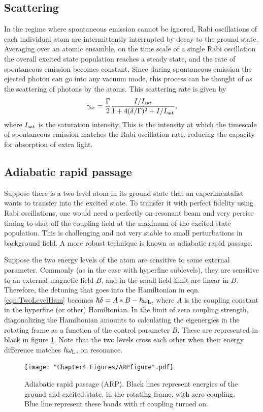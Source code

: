 \subsection{Scattering}
In the regime where spontaneous emission cannot be ignored, Rabi oscillations of each individual atom are intermittently interrupted by decay to the ground state. Averaging over an atomic ensamble, on the time scale of a single Rabi oscillation the overall excited state population reaches a steady state, and the rate of spontaneous emission becomes constant. Since during spontaneous emission the ejected photon can go into any vacuum mode, this process can be thought of as the scattering of photons by the atoms. This scattering rate is given by\cite{LCT}
\begin{equation}
\gamma_{\rm{sc}}= \frac{\Gamma}{2} \frac{I/I_{\rm{sat}}}{1+4(\delta/\Gamma)^2 +I/I_{\rm{sat}}},
\label{eq:scatrate}
\end{equation}
where $I_{\rm{sat}}$ is the saturation intensity. This is the intensity at which the timescale of spontaneous emission matches the Rabi oscillation rate, reducing the capacity for absorption of extra light.   

\subsection{Adiabatic rapid passage}

Suppose there is a two-level atom in its ground state that an experimentalist wants to transfer into the excited state. To transfer it with perfect fidelity using Rabi oscillations, one would need a perfectly on-resonant beam and very percise timing to shut off the coupling field at the maximum of the excited state population. This is challenging and not very stable to small perturbations in background field. A more robust technique is known as adiabatic rapid passage. 

Suppose the two energy levels of the atom are sensitive to some external parameter. Commonly (as in the case with hyperfine sublevels), they are sensitive to an external magnetic field $B$, and in the small field limit are linear in $B$. Therefore, the detuning that goes into the Hamiltonian in eqn. \ref{eqn:TwoLevelHam} becomes $\hbar\delta = A*B - \hbar\omega_{\rm L}$, where $A$ is the coupling constant in the hyperfine (or other) Hamiltonian.   In the limit of zero coupling strength, diagonalizing the Hamiltonian amounts to calculating the eigenergies in the rotating frame as a function of the control parameter $B$. These are represented in black in figure \ref{fig:ARPfigure}. Note that the two levels cross each other when their energy difference matches $\hbar\omega_{\rm L}$, on resonance.
\begin{figure}
	\texttt{[image: "Chapter4 Figures/ARPfigure".pdf]}
\caption{Adiabatic rapid passage (ARP). Black lines represent energies of the ground and excited state, in the rotating frame, with zero coupling. Blue line represent these bands with rf coupling turned on.}
\label{fig:ARPfigure}
\end{figure}

